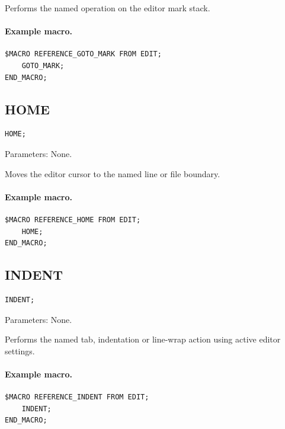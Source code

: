 \documentclass[a4paper,10pt,twoside,openany]{book}
\begin{document}
Performs the named operation on the editor mark stack.

\paragraph{Example macro.}
\begin{verbatim}
$MACRO REFERENCE_GOTO_MARK FROM EDIT;
    GOTO_MARK;
END_MACRO;
\end{verbatim}

\label{prim:procedure-home}
\subsection*{HOME}
\begin{verbatim}
HOME;
\end{verbatim}
Parameters: None.

Moves the editor cursor to the named line or file boundary.

\paragraph{Example macro.}
\begin{verbatim}
$MACRO REFERENCE_HOME FROM EDIT;
    HOME;
END_MACRO;
\end{verbatim}

\label{prim:procedure-indent}
\subsection*{INDENT}
\begin{verbatim}
INDENT;
\end{verbatim}
Parameters: None.

Performs the named tab, indentation or line-wrap action using active editor settings.

\paragraph{Example macro.}
\begin{verbatim}
$MACRO REFERENCE_INDENT FROM EDIT;
    INDENT;
END_MACRO;
\end{verbatim}
\end{document}
